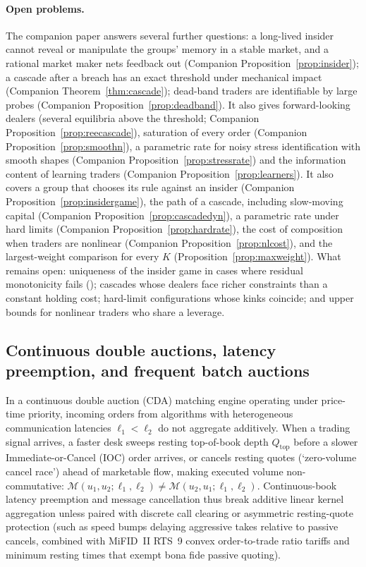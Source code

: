 \documentclass[12pt]{article}
\theoremstyle{definition}
\theoremstyle{remark}
\begin{document}
\paragraph{Open problems.} The companion paper \citep{niroula2026c} answers several further questions: a long-lived insider cannot reveal or manipulate the groups' memory in a stable market, and a rational market maker nets feedback out (Companion Proposition~\ref{prop:insider}); a cascade after a breach has an exact threshold under mechanical impact (Companion Theorem~\ref{thm:cascade}); dead-band traders are identifiable by large probes (Companion Proposition~\ref{prop:deadband}). It also gives forward-looking dealers (several equilibria above the threshold; Companion Proposition~\ref{prop:reecascade}), saturation of every order (Companion Proposition~\ref{prop:smoothn}), a parametric rate for noisy stress identification with smooth shapes (Companion Proposition~\ref{prop:stressrate}) and the information content of learning traders (Companion Proposition~\ref{prop:learners}). It also covers a group that chooses its rule against an insider (Companion Proposition~\ref{prop:insidergame}), the path of a cascade, including slow-moving capital (Companion Proposition~\ref{prop:cascadedyn}), a parametric rate under hard limits (Companion Proposition~\ref{prop:hardrate}), the cost of composition when traders are nonlinear (Companion Proposition~\ref{prop:nlcost}), and the largest-weight comparison for every $K$ (Proposition~\ref{prop:maxweight}). What remains open: uniqueness of the insider game in cases where residual monotonicity fails (\citealp[their Proposition~S17.3]{niroula2026full}); cascades whose dealers face richer constraints than a constant holding cost; hard-limit configurations whose kinks coincide; and upper bounds for nonlinear traders who share a leverage.




\subsection{Continuous double auctions, latency preemption, and frequent batch auctions}\label{sec:latency_batch}
In a continuous double auction (CDA) matching engine operating under price-time priority, incoming orders from algorithms with heterogeneous communication latencies $\ell_1 < \ell_2$ do not aggregate additively. When a trading signal arrives, a faster desk sweeps resting top-of-book depth $Q_{\mathrm{top}}$ before a slower Immediate-or-Cancel (IOC) order arrives, or cancels resting quotes (`zero-volume cancel race') ahead of marketable flow, making executed volume non-commutative: $\mathcal{M}(u_1, u_2; \ell_1, \ell_2) \neq \mathcal{M}(u_2, u_1; \ell_1, \ell_2)$. Continuous-book latency preemption and message cancellation thus break additive linear kernel aggregation unless paired with discrete call clearing or asymmetric resting-quote protection (such as speed bumps delaying aggressive takes relative to passive cancels, combined with MiFID~II RTS~9 convex order-to-trade ratio tariffs and minimum resting times that exempt bona fide passive quoting).
\end{document}

